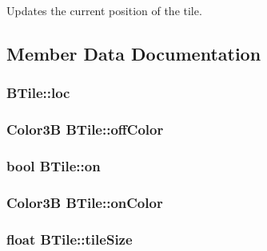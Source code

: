 \-Updates the current position of the tile. 



\subsection{\-Member \-Data \-Documentation}
\hypertarget{class_b_tile_a9a106634c3890eaa7a69cddc9680d822}{
\subsubsection[{loc}]{ {\bf \-B\-Tile\-::loc}}}\label{class_b_tile_a9a106634c3890eaa7a69cddc9680d822}
\hypertarget{class_b_tile_a06ca0d5b7b5c17a3d8c53395c2614a87}{
\subsubsection[{off\-Color}]{\setlength{\rightskip}{0pt plus 5cm}\-Color3\-B {\bf \-B\-Tile\-::off\-Color}}}\label{class_b_tile_a06ca0d5b7b5c17a3d8c53395c2614a87}
\hypertarget{class_b_tile_a793fe978c4d34fc611dbe7d21079610d}{
\subsubsection[{on}]{\setlength{\rightskip}{0pt plus 5cm}bool {\bf \-B\-Tile\-::on}}}\label{class_b_tile_a793fe978c4d34fc611dbe7d21079610d}
\hypertarget{class_b_tile_adf1af86d1ae9fdc122007381d4bf0a94}{
\subsubsection[{on\-Color}]{\setlength{\rightskip}{0pt plus 5cm}\-Color3\-B {\bf \-B\-Tile\-::on\-Color}}}\label{class_b_tile_adf1af86d1ae9fdc122007381d4bf0a94}
\hypertarget{class_b_tile_a0c85a54373837c9bbe0fa2f83475234b}{
\subsubsection[{tile\-Size}]{\setlength{\rightskip}{0pt plus 5cm}float {\bf \-B\-Tile\-::tile\-Size}}}\label{class_b_tile_a0c85a54373837c9bbe0fa2f83475234b}



